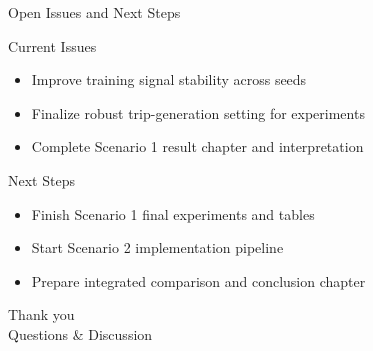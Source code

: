 ﻿\documentclass[aspectratio=169]{beamer}
\newcommand{\tightlist}{\setlength{\itemsep}{4pt}\setlength{\parskip}{0pt}}
\begin{document}
\begin{frame}{Open Issues and Next Steps}
\begin{block}{Current Issues}
\begin{itemize}\tightlist
  \item Improve training signal stability across seeds
  \item Finalize robust trip-generation setting for experiments
  \item Complete Scenario 1 result chapter and interpretation
\end{itemize}
\end{block}

\begin{block}{Next Steps}
\begin{itemize}\tightlist
  \item Finish Scenario 1 final experiments and tables
  \item Start Scenario 2 implementation pipeline
  \item Prepare integrated comparison and conclusion chapter
\end{itemize}
\end{block}
\end{frame}

\begin{frame}
\centering
\Huge Thank you \\
\vspace{0.5em}
\Large Questions \& Discussion
\end{frame}
\end{document}
